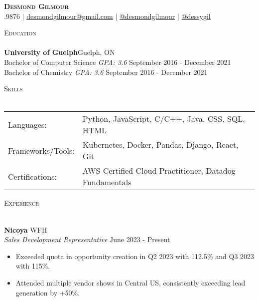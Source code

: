 \documentclass[a4paper]{article}
\newcommand{\lineunder} {
    \vspace*{-8pt} \\
    \hspace*{-18pt} \hrulefill \\
}
\newcommand{\header} [1] {
    {\hspace*{-18pt}\vspace*{6pt} \textsc{#1}}
    \vspace*{-6pt} \lineunder
}
\begin{document}
\vspace*{-40pt}

    

\vspace*{-10pt}
\begin{center}

	\textbf{{\Huge \scshape {Desmond Gilmour}}}\\
	\faPhone{}.9876 $|$ 
        \faEnvelope\space\href{mailto:desmondgilmour@gmail.com}{desmondgilmour@gmail.com} $|$  
        \faLinkedinSquare\space\href{https://www.linkedin.com/in/desmond-gilmour-886b3a128/}{@desmondgilmour} $|$
        \faGithubSquare\space\href{https://github.com/dessygil}{@dessygil}
        \\
\end{center}


\header{Education}
\textbf{University of Guelph}\hfill Guelph, ON\\
Bachelor of Computer Science \textit{GPA: 3.6} \hfill September 2016 - December 2021\\
Bachelor of Chemistry  \textit{GPA: 3.6} \hfill September 2016 - December 2021\\
\vspace{2mm}

\header{Skills}
\begin{tabular}{ l l }
	Languages:        & Python, JavaScript, C/C++, Java, CSS, SQL, HTML                      \\
	Frameworks/Tools: &  Kubernetes, Docker, Pandas, Django, React, Git \\
        Certifications: & AWS Certified Cloud Practitioner, Datadog Fundamentals \\
\end{tabular}
\vspace{2mm}

\header{Experience}
\vspace{1mm}

\textbf{Nicoya} \hfill WFH\\
\textit{Sales Development Representative} \hfill June 2023 - Present\\
\vspace{-1mm}
\begin{itemize} \itemsep 1pt
	\item Exceeded quota in opportunity creation in Q2 2023 with 112.5\% and Q3 2023 with 115\%.
	\item Attended multiple vendor shows in Central US, consistently exceeding lead generation by +50\%.
\end{itemize}
\end{document}
